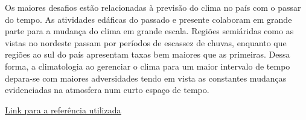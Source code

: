 \newpar Os maiores desafios estão relacionadas à previsão do clima no país com o passar do tempo. As atividades edáficas do passado e presente colaboram em grande parte para a mudança do clima em grande escala. Regiões semiáridas como as vistas no nordeste passam por períodos de escassez de chuvas, enquanto que regiões ao sul do país apresentam taxas bem maiores que as primeiras. Dessa forma, a climatologia ao gerenciar o clima para um maior intervalo de tempo depara-se com maiores adversidades tendo em vista as constantes mudanças evidenciadas na atmosfera num curto espaço de tempo.

\href{https://infograficos.estadao.com.br/sustentabilidade/desafios-do-clima/desmatamento.php}{\underline{Link para a referência utilizada}}
